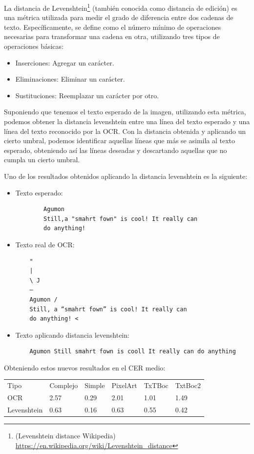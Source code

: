 La distancia de Levenshtein\footnote{(Levenshtein distance Wikipedia) \url{https://en.wikipedia.org/wiki/Levenshtein_distance} } (también conocida como distancia de edición) es una métrica utilizada para medir el grado de diferencia entre dos cadenas de texto. Específicamente, se define como el número mínimo de operaciones necesarias para transformar una cadena en otra, utilizando tres tipos de operaciones básicas:
\begin{itemize}
	\item Inserciones: Agregar un carácter.
	\item Eliminaciones: Eliminar un carácter.
	\item Sustituciones: Reemplazar un carácter por otro.
\end{itemize}

Suponiendo que tenemos el texto esperado de la imagen,  utilizando esta métrica, podemos obtener la distancia levenshtein entre una línea del texto esperado y una línea del texto reconocido por la OCR. Con la distancia obtenida y aplicando un cierto umbral, podemos identificar aquellas líneas que más se asimila al texto esperado, obteniendo así las líneas deseadas y descartando aquellas que no cumpla un cierto umbral.

Uno de los resultados obtenidos aplicando la distancia levenshtein es la siguiente:
\begin{itemize}
	\item Texto esperado:
	
	\begin{verbatim}
		Agumon
		Still,a "smahrt fown" is cool! It really can
		do anything!
	\end{verbatim}
	\item Texto real de OCR:
	
		\begin{verbatim}
	"
	|
	\ J
	—
	Agumon /
	Still, a “smahrt fown” is cool! It really can
	do anything! <
	\end{verbatim}
	\item Texto aplicando distancia levenshtein:
	\begin{verbatim}
	Agumon Still smahrt fown is cooll It really can do anything
	\end{verbatim}
\end{itemize}  
Obteniendo estos nuevos resultados en el CER medio:

\begin{table}[H]
	\begin{tabular}{llllll}
		Tipo        & Complejo & Simple & PixelArt & TxTBoc & TxtBoc2                      \\
		OCR         & 2.57     & 0.29   & 2.01     & 1.01   & \cellcolor[HTML]{FFFFFF}1.49 \\
		Levenshtein & 0.63     & 0.16   & 0.63     & 0.55   & 0.42                        
	\end{tabular}
\end{table}
